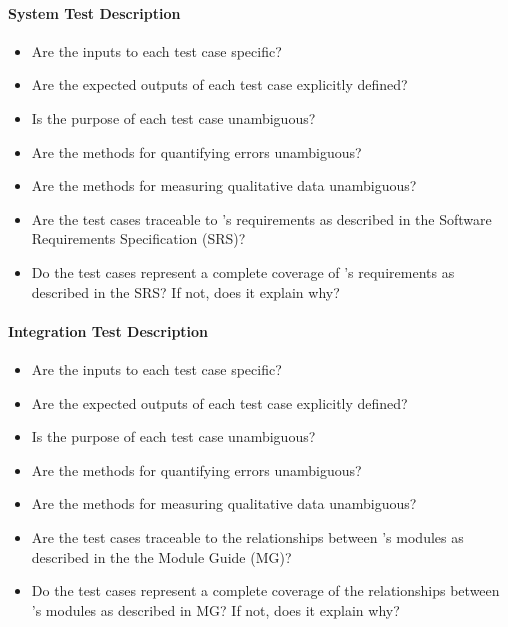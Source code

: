 \paragraph{System Test Description}
\begin{itemize}

    \item Are the inputs to each test case specific?

    \item Are the expected outputs of each test case explicitly defined?

    \item Is the purpose of each test case unambiguous?

    \item Are the methods for quantifying errors unambiguous?

    \item Are the methods for measuring qualitative data unambiguous?

    \item Are the test cases traceable to \progname{}'s requirements as
    described in the Software Requirements Specification (SRS)?

    \item Do the test cases represent a complete coverage of \progname{}'s
    requirements as described in the SRS? If not, does it explain why?

\end{itemize}

\paragraph{Integration Test Description}
\begin{itemize}

    \item Are the inputs to each test case specific?

    \item Are the expected outputs of each test case explicitly defined?

    \item Is the purpose of each test case unambiguous?

    \item Are the methods for quantifying errors unambiguous?

    \item Are the methods for measuring qualitative data unambiguous?

    \item Are the test cases traceable to the relationships between
    \progname{}'s modules as described in the the Module Guide (MG)?

    \item Do the test cases represent a complete coverage of the relationships
    between \progname{}'s modules as described in MG? If not, does it explain
    why?

\end{itemize}

